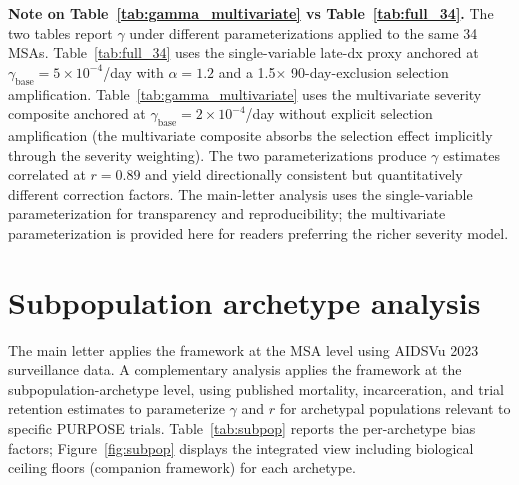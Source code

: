\documentclass[11pt]{article}
\begin{document}
\textbf{Note on Table~\ref{tab:gamma_multivariate} vs Table~\ref{tab:full_34}.} The two tables report $\gamma$ under different parameterizations applied to the same 34 MSAs. Table~\ref{tab:full_34} uses the single-variable late-dx proxy anchored at $\gamma_{\mathrm{base}} = 5 \times 10^{-4}$/day with $\alpha = 1.2$ and a 1.5$\times$ 90-day-exclusion selection amplification. Table~\ref{tab:gamma_multivariate} uses the multivariate severity composite anchored at $\gamma_{\mathrm{base}} = 2 \times 10^{-4}$/day without explicit selection amplification (the multivariate composite absorbs the selection effect implicitly through the severity weighting). The two parameterizations produce $\gamma$ estimates correlated at $r = 0.89$ and yield directionally consistent but quantitatively different correction factors. The main-letter analysis uses the single-variable parameterization for transparency and reproducibility; the multivariate parameterization is provided here for readers preferring the richer severity model.

\section{Subpopulation archetype analysis}\label{sec:subpop}

The main letter applies the framework at the MSA level using AIDSVu 2023 surveillance data. A complementary analysis applies the framework at the subpopulation-archetype level, using published mortality, incarceration, and trial retention estimates to parameterize $\gamma$ and $r$ for archetypal populations relevant to specific PURPOSE trials. Table~\ref{tab:subpop} reports the per-archetype bias factors; Figure~\ref{fig:subpop} displays the integrated view including biological ceiling floors (companion framework) for each archetype.
\end{document}

